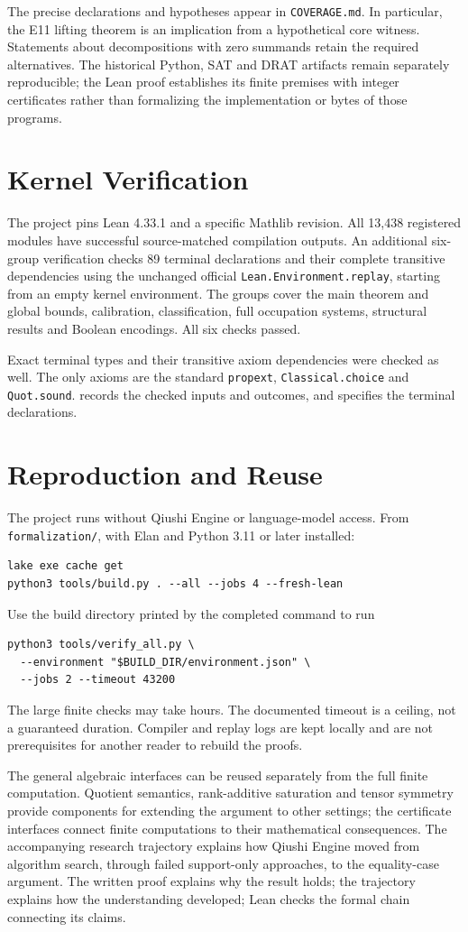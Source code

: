 \documentclass[11pt]{article}
\begin{document}
The precise declarations and hypotheses appear in \texttt{COVERAGE.md}.
In particular, the E11 lifting theorem is an implication from a hypothetical
core witness. Statements
about decompositions with zero summands retain the required alternatives.
The historical Python, SAT and DRAT artifacts remain separately reproducible;
the Lean proof establishes its finite premises with integer certificates
rather than formalizing the implementation or bytes of those programs.

\section{Kernel Verification}
The project pins Lean 4.33.1 and a specific Mathlib revision. All 13,438
registered modules have successful source-matched compilation outputs.
An additional six-group verification checks 89 terminal declarations and
their complete transitive dependencies using the unchanged official
\texttt{Lean.Environment.replay}, starting from an empty kernel environment.
The groups cover the main theorem and global bounds, calibration,
classification, full occupation systems, structural results and Boolean
encodings. All six checks passed.

Exact terminal types and their transitive axiom dependencies were checked
as well. The only axioms are the standard
\texttt{propext}, \texttt{Classical.choice} and \texttt{Quot.sound}.
 records the checked inputs and outcomes,
and  specifies the terminal declarations.

\section{Reproduction and Reuse}
The project runs without Qiushi Engine or language-model access. From
\texttt{formalization/}, with Elan and Python 3.11 or later installed:
\begin{lstlisting}
lake exe cache get
python3 tools/build.py . --all --jobs 4 --fresh-lean
\end{lstlisting}
Use the build directory printed by the completed command to run
\begin{lstlisting}
python3 tools/verify_all.py \
  --environment "$BUILD_DIR/environment.json" \
  --jobs 2 --timeout 43200
\end{lstlisting}
The large finite checks may take hours. The documented timeout is a ceiling,
not a guaranteed duration. Compiler and replay logs are kept locally and are
not prerequisites for another reader to rebuild the proofs.

The general algebraic interfaces can be reused separately from the full
finite computation. Quotient semantics, rank-additive saturation and tensor
symmetry provide components for extending the argument to other settings;
the certificate interfaces connect finite computations to their mathematical
consequences. The accompanying research
trajectory explains how Qiushi Engine moved from algorithm search, through
failed support-only approaches, to the equality-case argument. The written
proof explains why the result holds; the trajectory explains how the
understanding developed; Lean checks the formal chain connecting its claims.
\end{document}
